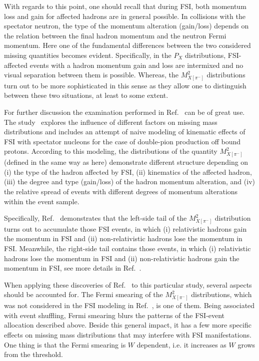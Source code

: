 With regards to this point, one should recall that during FSI, both momentum loss and gain for affected hadrons are in general possible. In collisions with the spectator neutron, the type of the momentum alteration (gain/loss) depends on the relation between the final hadron momentum and the neutron Fermi momentum. Here one of the fundamental differences between the two considered missing quantities becomes evident. Specifically, in the $P_{X}$ distributions, FSI-affected events with a hadron momentum gain and loss are intermixed and no visual separation between them is possible. Whereas, the $M^{2}_{X[\pi^{-}]}$ distributions turn out to be more sophisticated in this sense as they allow one to distinguish between these two situations, at least to some extent.

For further discussion the examination performed in Ref.~\cite{note_mm_distr} can be of great use. The study~\cite{note_mm_distr} explores the influence of different factors on missing mass distributions and includes an attempt of naive modeling of kinematic effects of FSI with spectator nucleons for the case of double-pion production off bound protons. According to this modeling, the distributions of the quantity $M^{2}_{X[\pi^{-}]}$ (defined in the same way as here) demonstrate different structure depending on (i) the type of the hadron affected by FSI, (ii) kinematics of the affected hadron, (iii) the degree and type (gain/loss) of the hadron momentum alteration, and (iv) the relative spread of events with different degrees of momentum alterations within the event sample.


Specifically, Ref.~\cite{note_mm_distr} demonstrates that the left-side tail of the $M^{2}_{X[\pi^{-}]}$ distribution turns out to accumulate those FSI events, in which (i) relativistic hadrons gain the momentum in FSI and (ii) non-relativistic hadrons lose the momentum in FSI. Meanwhile, the right-side tail contains those events, in which (i) relativistic hadrons lose the momentum in FSI and (ii) non-relativistic hadrons gain the momentum in FSI, see more details in Ref.~\cite{note_mm_distr}.



When applying these discoveries of Ref.~\cite{note_mm_distr} to this particular study, several aspects should be accounted for. The Fermi smearing of the $M^{2}_{X[\pi^{-}]}$ distributions, which was not considered in the FSI modeling in Ref.~\cite{note_mm_distr}, is one of them. Being associated with event shuffling, Fermi smearing blurs the patterns of the FSI-event allocation described above. Beside this general impact, it has a few more specific effects on missing mass distributions that may interfere with FSI manifestations. One thing is that the Fermi smearing is $W$ dependent, i.e. it increases as $W$ grows from the threshold.

